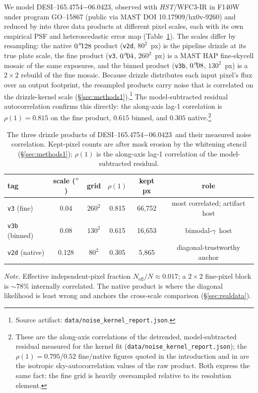 \documentclass[11pt,letterpaper]{article}
\newcommand{\gammaEPL}{\ensuremath{\gamma}}
\newcommand{\Neff}{\ensuremath{N_{\mathrm{eff}}}}
\newcommand{\foundry}{DESI--165.4754$-$06.0423}
\newcommand{\art}[1]{\footnote{Source artifact: \texttt{#1}.}}
\newcommand{\dfile}[1]{\texttt{#1}}
\begin{document}
We model \foundry, observed with {\it HST}/WFC3-IR in F140W under program
GO--15867 (public via MAST DOI 10.17909/hx0v-9260) and reduced by
\citet{huang2025foundry1} into three data products at different pixel scales,
each with its own empirical PSF and heteroscedastic error map
(Table~\ref{tab:products}). The scales differ by resampling: the native
$0\mbox{$\!\!\,.{}^{\prime\prime}\!\!\,$}128$ product (\dfile{v2d}, $80^2$~px) is the pipeline drizzle at its
true plate scale, the fine product (\dfile{v3}, $0\mbox{$\!\!\,.{}^{\prime\prime}\!\!\,$}04$, $260^2$~px) is a
MAST HAP fine-skycell mosaic of the same exposures, and the binned product
(\dfile{v3b}, $0\mbox{$\!\!\,.{}^{\prime\prime}\!\!\,$}08$, $130^2$~px) is a $2\times2$ rebuild of the fine
mosaic. Because drizzle \citep{fruchterhook2002drizzle} distributes each input
pixel's flux over an output footprint, the resampled products carry noise that
is correlated on the drizzle-kernel scale
(\S\ref{sec:methods1}).\art{data/noise\_kernel\_report.json} The
model-subtracted residual autocorrelation confirms this directly: the along-axis
lag-1 correlation is $\rho(1)=0.815$ on the fine product, $0.615$ binned, and
$0.305$ native.\footnote{These are the along-axis correlations of the
detrended, model-subtracted residual measured for the kernel fit
(\dfile{data/noise\_kernel\_report.json}); the $\rho(1)=0.795$/$0.52$
fine/native figures quoted in the introduction and in \citet{huang2025foundry1}
are the isotropic sky-autocorrelation values of the raw product. Both express
the same fact: the fine grid is heavily oversampled relative to its resolution
element.}

\begin{table}[ht]
\centering
\caption{The three drizzle products of \foundry\ and their measured noise
correlation. Kept-pixel counts are after mask erosion by the whitening stencil
(\S\ref{sec:methods1}); $\rho(1)$ is the along-axis lag-1 correlation of the
model-subtracted residual.}
\label{tab:products}
\begin{tabular}{lccccc}
\toprule
tag & scale ($''$) & grid & $\rho(1)$ & kept px & role \\
\midrule
\dfile{v3}  (fine)   & 0.04  & $260^2$ & 0.815 & 66{,}752 & most correlated; artifact host \\
\dfile{v3b} (binned) & 0.08  & $130^2$ & 0.615 & 16{,}653 & bimodal-\gammaEPL\ host \\
\dfile{v2d} (native) & 0.128 & $80^2$  & 0.305 &  5{,}865 & diagonal-trustworthy anchor \\
\bottomrule
\end{tabular}
\par\smallskip
{\footnotesize\textit{Note.} Effective independent-pixel fraction
$\Neff/N\approx0.017$; a $2\times2$ fine-pixel block is $\sim$$78\%$
internally correlated. The native product is where the diagonal likelihood is
least wrong and anchors the cross-scale comparison (\S\ref{sec:realdata}).}
\end{table}
\end{document}
